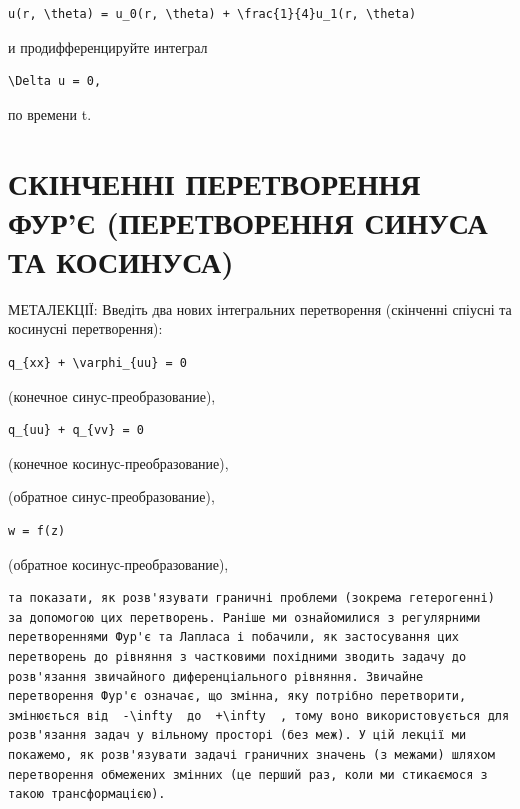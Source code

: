 \documentclass[
  ukrainian,
]{article}
\begin{document}
\begin{verbatim}
u(r, \theta) = u_0(r, \theta) + \frac{1}{4}u_1(r, \theta)
\end{verbatim}

и продифференцируйте интеграл

\begin{verbatim}
\Delta u = 0,
\end{verbatim}

по времени t.

\section{СКІНЧЕННІ ПЕРЕТВОРЕННЯ ФУР'Є (ПЕРЕТВОРЕННЯ СИНУСА ТА
КОСИНУСА)}\label{ux441ux43aux456ux43dux447ux435ux43dux43dux456-ux43fux435ux440ux435ux442ux432ux43eux440ux435ux43dux43dux44f-ux444ux443ux440ux454-ux43fux435ux440ux435ux442ux432ux43eux440ux435ux43dux43dux44f-ux441ux438ux43dux443ux441ux430-ux442ux430-ux43aux43eux441ux438ux43dux443ux441ux430}

МЕТАЛЕКЦІЇ: Введіть два нових інтегральних перетворення (скінченні
спіусні та косинусні перетворення):

\begin{verbatim}
q_{xx} + \varphi_{uu} = 0
\end{verbatim}

(конечное синус-преобразование),

\begin{verbatim}
q_{uu} + q_{vv} = 0
\end{verbatim}

(конечное косинус-преобразование),

(обратное синус-преобразование),

\begin{verbatim}
w = f(z)
\end{verbatim}

(обратное косинус-преобразование),

\begin{verbatim}
та показати, як розв'язувати граничні проблеми (зокрема гетерогенні) за допомогою цих перетворень. Раніше ми ознайомилися з регулярними перетвореннями Фур'є та Лапласа і побачили, як застосування цих перетворень до рівняння з частковими похідними зводить задачу до розв'язання звичайного диференціального рівняння. Звичайне перетворення Фур'є означає, що змінна, яку потрібно перетворити, змінюється від  -\infty  до  +\infty  , тому воно використовується для розв'язання задач у вільному просторі (без меж). У цій лекції ми покажемо, як розв'язувати задачі граничних значень (з межами) шляхом перетворення обмежених змінних (це перший раз, коли ми стикаємося з такою трансформацією).
\end{verbatim}
\end{document}
